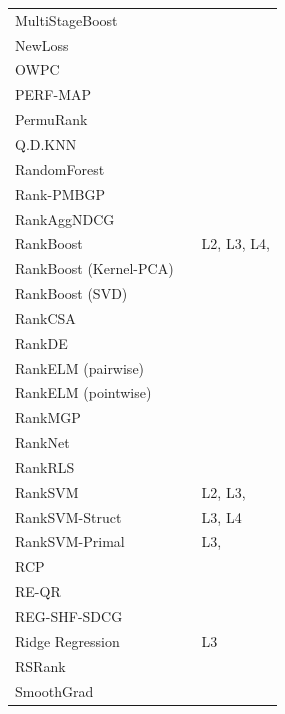 \documentclass[english, authoryear, preprint]{elsarticle}
\begin{document}
\begin{table}[!hpt]
{\begin{tabular}{lll}
MultiStageBoost & \cite{Kao2013} & \cite{Kao2013}\\
NewLoss & \cite{Peng2010} & \cite{Peng2010}\\
OWPC & \cite{Usunier2009} & \cite{Usunier2009}\\
PERF-MAP & \cite{Pan2011} & \cite{Torkestani2012b}\\
PermuRank & \cite{Xu2008} & \cite{Xu2008}\\
Q.D.KNN & \cite{Geng2008} & \cite{Wang2013}\\
RandomForest & \cite{Gomes2013} & \cite{Gomes2013}\\
Rank-PMBGP & \cite{Sato2013} & \cite{Sato2013}\\
RankAggNDCG & \cite{Wang2013} & \cite{Wang2013}\\
RankBoost & \cite{Freund2003} & L2, L3, L4, \cite{Busa-Fekete2013, Alcantara2010, Sato2013}\\
RankBoost (Kernel-PCA) & \cite{Duh2008} & \cite{Duh2008, Sato2013}\\
RankBoost (SVD) & \cite{Lin2009} & \cite{Lin2009}\\
RankCSA & \cite{He2010} & \cite{He2010}\\
RankDE & \cite{Bollegala2011} & \cite{Sato2013}\\
RankELM (pairwise) & \cite{Zong2013} & \cite{Zong2013}\\
RankELM (pointwise) & \cite{Zong2013} & \cite{Zong2013}\\
RankMGP & \cite{Lin2012} & \cite{Lin2012}\\
RankNet & \cite{Burges2005} & \cite{Busa-Fekete2013, Papini2012, Niu2012}\\
RankRLS & \cite{Pahikkala2009} & \cite{Pahikkala2010}\\
RankSVM & \cite{Herbrich1999, Joachims2002} & L2, L3, \cite{Busa-Fekete2013, Freno2011, He2010, Alcantara2010, Papini2012}\\
RankSVM-Struct &  & L3, L4\\
RankSVM-Primal &  & L3, \cite{Lai2011}\\
RCP & \cite{Elsas2008} & \cite{Elsas2008}\\
RE-QR & \cite{Veloso2010} & \cite{Veloso2010}\\
REG-SHF-SDCG & \cite{Wu2009} & \cite{Wu2009}\\
Ridge Regression & \cite{Cossock2006} & L3\\
RSRank & \cite{Sun2009} & \cite{Lai2013}\\
SmoothGrad & \cite{Le2007} & \cite{Tan2013}\\

\end{tabular}}
\end{table}
\end{document}

